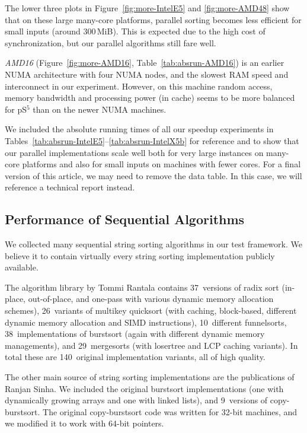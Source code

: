 \documentclass[a4paper]{myjournal}
\begin{document}
The lower three plots in Figure~\ref{fig:more-IntelE5} and \ref{fig:more-AMD48}
show that on these large many-core platforms, parallel sorting becomes less
efficient for small inputs (around 300\,MiB). This is expected due to the high
cost of synchronization, but our parallel algorithms still fare well.

\emph{AMD16} (Figure~\ref{fig:more-AMD16}, Table~\ref{tab:absrun-AMD16}) is an earlier NUMA architecture with
four NUMA nodes, and the slowest RAM speed and interconnect in our
experiment. However, on this machine random access, memory bandwidth and
processing power (in cache) seems to be more balanced for pS$^5$ than on the
newer NUMA machines.

We included the absolute running times of all our speedup experiments in
Tables~\ref{tab:absrun-IntelE5}--\ref{tab:absrun-IntelX5b} for reference and to
show that our parallel implementations scale well both for very large instances
on many-core platforms and also for small inputs on machines with fewer cores.
For a final version of this article, we may need to remove the data
table. In this case, we will reference a technical report instead.

\subsection{Performance of Sequential Algorithms}\label{sec:exp-sequential}

We collected many sequential string sorting algorithms in our test framework. We
believe it to contain virtually every string sorting implementation publicly
available.

The algorithm library by Tommi Rantala \cite{rantala2007web} contains 37~versions
of radix sort (in-place, out-of-place, and one-pass with various dynamic memory
allocation schemes), 26~variants of multikey quicksort (with caching,
block-based, different dynamic memory allocation and SIMD instructions),
10~different funnelsorts, 38~implementations of burstsort (again with different
dynamic memory managements), and 29~mergesorts (with losertree and LCP caching
variants). In total these are 140~original implementation variants, all of high
quality.

The other main source of string sorting implementations are the publications of
Ranjan Sinha. We included the original burstsort implementations (one with
dynamically growing arrays and one with linked lists), and 9~versions of
copy-burstsort. The original copy-burstsort code was written for 32-bit
machines, and we modified it to work with 64-bit pointers.
\end{document}
